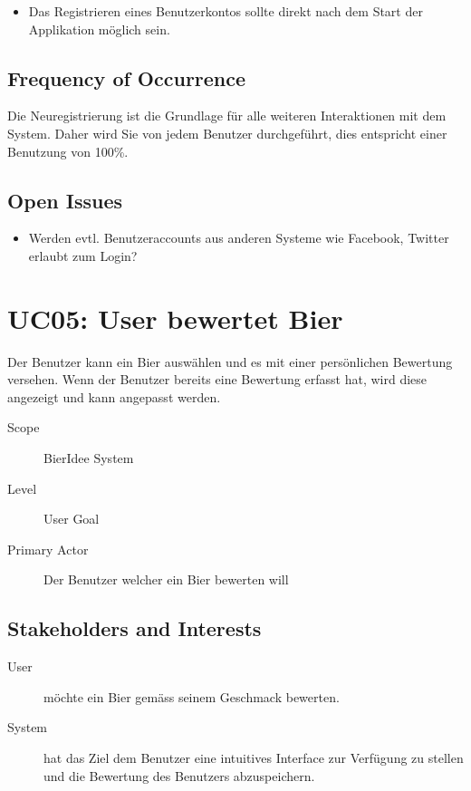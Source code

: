 \documentclass[10pt,a4paper]{scrartcl}
\begin{document}
\begin{itemize}
\item Das Registrieren eines Benutzerkontos sollte direkt nach dem Start der Applikation möglich sein. 
\end{itemize}



\subsection*{Frequency of Occurrence}

Die Neuregistrierung ist die Grundlage für alle weiteren Interaktionen mit dem System. Daher wird Sie von jedem Benutzer durchgeführt, dies entspricht einer Benutzung von 100\%.


\subsection*{Open Issues}

\begin{itemize}
\item Werden evtl. Benutzeraccounts aus anderen Systeme wie Facebook, Twitter erlaubt zum Login?
\end{itemize}


\section*{UC05: User bewertet Bier}
Der Benutzer kann ein Bier auswählen und es mit einer persönlichen Bewertung versehen. Wenn der Benutzer bereits eine Bewertung erfasst hat, wird diese angezeigt und kann angepasst werden.

\begin{description}
\item[Scope] BierIdee System
\item[Level] User Goal
\item[Primary Actor] Der Benutzer welcher ein Bier bewerten will
\end{description}


\subsection*{Stakeholders and Interests}

\begin{description}
\item[User] möchte ein Bier gemäss seinem Geschmack bewerten.
\item[System] hat das Ziel dem Benutzer eine intuitives Interface zur Verfügung zu stellen und die Bewertung des Benutzers abzuspeichern.
\end{description}
\end{document}
